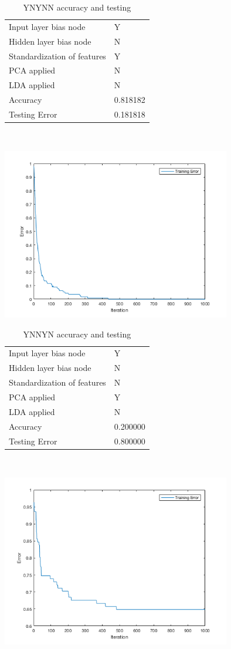 \documentclass[12pt]{article}
\newcommand{\accuracyAndTestErrorTable}[8]{
  \begin{tabular}{l|l}
    \hline
    Input layer bias node & #1 \\
    Hidden layer bias node & #2 \\
    Standardization of features & #3 \\
    PCA applied & #4 \\
    LDA applied & #5 \\
    \hline
    Accuracy & #6 \\
    Testing Error & #7 \\
    \hline
  \end{tabular}
  ~\\[60pt]
  \caption{#8}
}
\begin{document}
\begin{center}
  \begin{table}[H]
    \begin{varwidth}[b]{0.4\linewidth}
      \centering
      \accuracyAndTestErrorTable{Y}{N}{Y}{N}{N}{0.818182}{0.181818}{YNYNN accuracy and testing}
      \label{table:YNYNN}
    \end{varwidth}%
    \hfill
    \begin{minipage}[b]{0.6\linewidth}
      \centering
      \includegraphics[width=100mm]{YNYNN_training_error.png}
      \label{fig:YNYNN}
    \end{minipage}
  \end{table}
\end{center}

\begin{center}
  \begin{table}[H]
    \begin{varwidth}[b]{0.4\linewidth}
      \centering
      \accuracyAndTestErrorTable{Y}{N}{N}{Y}{N}{0.200000}{0.800000}{YNNYN accuracy and testing}
      \label{table:YNNYN}
    \end{varwidth}%
    \hfill
    \begin{minipage}[b]{0.6\linewidth}
      \centering
      \includegraphics[width=100mm]{YNNYN_training_error.png}
      \label{fig:YNNYN}
    \end{minipage}
  \end{table}
\end{center}
\end{document}
